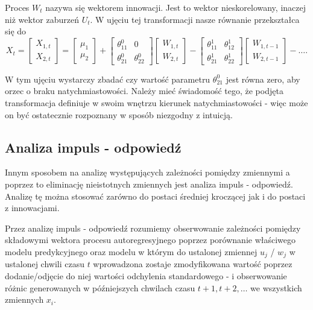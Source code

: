 \documentclass[10pt,a4paper]{book}
\begin{document}
Proces $W_t$ nazywa się wektorem innowacji. Jest to wektor nieskorelowany, inaczej niż wektor zaburzeń $U_t$. 
W ujęciu tej transformacji nasze równanie przekształca się do 
$$
X_t = \begin{bmatrix}
X_{1,t} \\
X_{2,t}
\end{bmatrix} = 
\begin{bmatrix}
\mu_1 \\
\mu_2
\end{bmatrix} + \begin{bmatrix}
\theta^0_{11} & 0 \\
\theta^0_{21} & \theta^0_{22}
\end{bmatrix}
\begin{bmatrix}
W_{1,t} \\
W_{2,t}
\end{bmatrix} - \begin{bmatrix}
\theta^1_{11} & \theta^1_{12} \\
\theta^1_{21} & \theta^1_{22}
\end{bmatrix} \begin{bmatrix}
W_{1,t-1} \\
W_{2,t-1}
\end{bmatrix} - \ldots .
$$

W tym ujęciu wystarczy zbadać czy wartość parametru $\theta^0_{21} $ jest równa zero,  aby orzec o braku natychmiastowości. Należy mieć świadomość tego, że podjęta transformacja definiuje w swoim wnętrzu kierunek natychmiastowości - więc może on być ostatecznie rozpoznany w sposób niezgodny z intuicją.

\subsection{Analiza impuls - odpowiedź} 

Innym sposobem na analizę występujących zależności pomiędzy zmiennymi a poprzez to eliminację nieistotnych zmiennych jest analiza impuls - odpowiedź. Analizę tę można stosować zarówno do postaci średniej kroczącej jak i do postaci z innowacjami. 

\begin{definition}
Przez analizę impuls - odpowiedź rozumiemy obserwowanie zależności pomiędzy składowymi wektora procesu autoregresyjnego poprzez porównanie właściwego modelu predykcyjnego oraz modelu w którym do ustalonej zmiennej $u_j$ / $w_j$ w ustalonej chwili czasu $t$ wprowadzona zostaje zmodyfikowana wartość poprzez dodanie/odjęcie do niej wartości odchylenia standardowego - i obserwowanie różnic generowanych w późniejszych chwilach czasu $t+1, t+2, \ldots$ we wszystkich zmiennych $x_i$. 
\end{definition}
\end{document}
